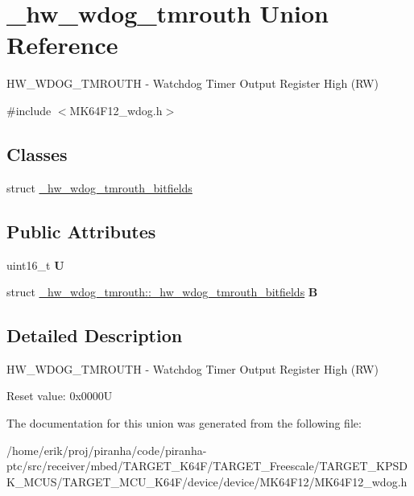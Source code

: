 \hypertarget{union__hw__wdog__tmrouth}{}\section{\+\_\+hw\+\_\+wdog\+\_\+tmrouth Union Reference}
\label{union__hw__wdog__tmrouth}


H\+W\+\_\+\+W\+D\+O\+G\+\_\+\+T\+M\+R\+O\+U\+TH -\/ Watchdog Timer Output Register High (RW)  




{\ttfamily \#include $<$M\+K64\+F12\+\_\+wdog.\+h$>$}

\subsection*{Classes}
\begin{DoxyCompactItemize}
\item 
struct \hyperlink{struct__hw__wdog__tmrouth_1_1__hw__wdog__tmrouth__bitfields}{\+\_\+hw\+\_\+wdog\+\_\+tmrouth\+\_\+bitfields}
\end{DoxyCompactItemize}
\subsection*{Public Attributes}
\begin{DoxyCompactItemize}
\item 
uint16\+\_\+t {\bfseries U}\hypertarget{union__hw__wdog__tmrouth_a1d708ba7e81043cf26f34f1687b6dd90}{}\label{union__hw__wdog__tmrouth_a1d708ba7e81043cf26f34f1687b6dd90}

\item 
struct \hyperlink{struct__hw__wdog__tmrouth_1_1__hw__wdog__tmrouth__bitfields}{\+\_\+hw\+\_\+wdog\+\_\+tmrouth\+::\+\_\+hw\+\_\+wdog\+\_\+tmrouth\+\_\+bitfields} {\bfseries B}\hypertarget{union__hw__wdog__tmrouth_a777e1223ce79f50dc6c87028a6d5a446}{}\label{union__hw__wdog__tmrouth_a777e1223ce79f50dc6c87028a6d5a446}

\end{DoxyCompactItemize}


\subsection{Detailed Description}
H\+W\+\_\+\+W\+D\+O\+G\+\_\+\+T\+M\+R\+O\+U\+TH -\/ Watchdog Timer Output Register High (RW) 

Reset value\+: 0x0000U 

The documentation for this union was generated from the following file\+:\begin{DoxyCompactItemize}
\item 
/home/erik/proj/piranha/code/piranha-\/ptc/src/receiver/mbed/\+T\+A\+R\+G\+E\+T\+\_\+\+K64\+F/\+T\+A\+R\+G\+E\+T\+\_\+\+Freescale/\+T\+A\+R\+G\+E\+T\+\_\+\+K\+P\+S\+D\+K\+\_\+\+M\+C\+U\+S/\+T\+A\+R\+G\+E\+T\+\_\+\+M\+C\+U\+\_\+\+K64\+F/device/device/\+M\+K64\+F12/M\+K64\+F12\+\_\+wdog.\+h\end{DoxyCompactItemize}
